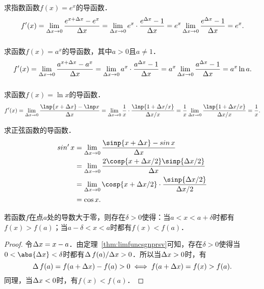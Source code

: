 \begin{example*}
  求指数函数\(f(x) = e^x\)的导函数．
  \begin{equation*}
    f'(x)
    = \lim_{\fwdf x \to 0} \frac{e^{x+\fwdf x} - e^x}{\fwdf x}
    = \lim_{\fwdf x \to 0} e^x \cdot \frac{e^{\fwdf x} - 1}{\fwdf x}
    = e^x \lim_{\fwdf x \to 0} \frac{e^{\fwdf x} - 1}{\fwdf x}
    = e^x.
    \rule[-3.5ex]{0ex}{0ex}
  \end{equation*}
\end{example*}

\begin{example*}
  求函数\(f(x) = a^x\)的导函数，其中\(a > 0\)且\(a \ne 1\)．
  \begin{equation*}
    f'(x)
    = \lim_{\fwdf x \to 0} \frac{a^{x+\fwdf x} - a^x}{\fwdf x}
    = \lim_{\fwdf x \to 0} a^x \cdot \frac{a^{\fwdf x} - 1}{\fwdf x}
    = a^x \lim_{\fwdf x \to 0} \frac{a^{\fwdf x} - 1}{\fwdf x}
    = a^x \ln a.
    \rule[-3.5ex]{0ex}{0ex}
  \end{equation*}
\end{example*}

\begin{example*}
  求函数\(f(x) = \ln x\)的导函数．
  \begin{equation*}
    f'(x)
    = \lim_{\fwdf x \to 0} \frac{\lnp{x+\fwdf x}- \lnp x}{\fwdf x}
    = \lim_{\fwdf x \to 0} \frac1x \cdot \frac{\lnp{1+\fwdf x/x}}{\fwdf x/x}
    = \frac1x \lim_{\fwdf x \to 0} \frac{\lnp{1+\fwdf x/x}}{\fwdf x/x}
    = \frac1x.
  \end{equation*}
\end{example*}

\begin{example*}
  求正弦函数的导函数．
  \begin{align*}
    \sin'x
    &= \lim_{\fwdf x \to 0} \frac{\sinp{x+\fwdf x}- \sin x}{\fwdf x} \\
    &= \lim_{\fwdf x \to 0} \frac{2 \cosp{x+\fwdf x/2} \sinp{\fwdf x/2}}{\fwdf x} \\
    &= \lim_{\fwdf x \to 0} \cosp{x+\fwdf x/2} \cdot \frac{\sinp{\fwdf x/2}}{\fwdf x/2} \\
    &= \cos x.
  \end{align*}
\end{example*}

\begin{example*}
  若函数\(f\)在点\(a\)处的导数大于零，则存在\(\delta > 0\)使得：当\(a < x < a+\delta\)时都有\(f(x) > f(a)\)；当\(a-\delta < x < a\)时都有\(f(x) < f(a)\)．

  \begin{proof}
    令\(\mathop{}\!\Delta x = x - a\)．由定理~\ref{thm:limfuncsgnprsv}可知，存在\(\delta > 0\)使得当\(0 < \abs{\fwdf x} < \delta\)时都有\(\mathop{}\!\Delta\,f(a)/\!\mathop{}\!\Delta x > 0\)．所以当\(\mathop{}\!\Delta x > 0\)时，有
    \begin{equation*}
      \mathop{}\!\Delta\,f(a) = f(a+\mathop{}\!\Delta x) - f(a) > 0
      \iff
      f(a+\mathop{}\!\Delta x) = f(x) > f(a).
    \end{equation*}
    同理，当\(\mathop{}\!\Delta x < 0\)时，有\(f(x) < f(a)\)．
  \end{proof}
\end{example*}

